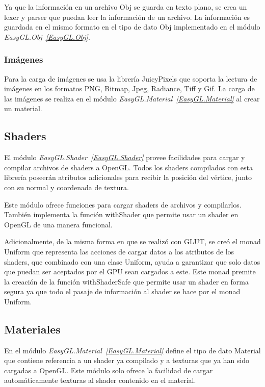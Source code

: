 Ya que la información en un archivo Obj se guarda en texto plano, se crea un lexer y parser que puedan leer la información de un archivo. La información es guardada en el mismo formato en el tipo de dato Obj implementado en el módulo \emph{EasyGL.Obj~\ref{EasyGL.Obj}}.

\subsubsection{Imágenes}

Para la carga de imágenes se usa la librería JuicyPixels \cite{libreria:JuicyPixels} que soporta la lectura de imágenes en los formatos PNG, Bitmap, Jpeg, Radiance, Tiff y Gif. La carga de las imágenes se realiza en el módulo \emph{EasyGL.Material~\ref{EasyGL.Material}} al crear un material.

\subsection{Shaders}

El módulo \emph{EasyGL.Shader~\ref{EasyGL.Shader}} provee facilidades para cargar y compilar archivos de shaders a OpenGL. Todos los shaders compilados con esta librería poseerán atributos adicionales para recibir la posición del vértice, junto con su normal y coordenada de textura.

Este módulo ofrece funciones para cargar shaders de archivos y compilarlos. También implementa la función withShader que permite usar un shader en OpenGL de una manera funcional.

Adicionalmente, de la misma forma en que se realizó con GLUT,  se creó el monad Uniform que representa las acciones de cargar datos a los atributos de los shaders, que combinado con una clase Uniform, ayuda a garantizar que solo datos que puedan ser aceptados por el GPU sean cargados a este. Este monad premite la creación de la función withShaderSafe que permite usar un shader en forma segura ya que todo el pasaje de información al shader se hace por el monad Uniform.

\subsection{Materiales}

En el módulo \emph{EasyGL.Material~\ref{EasyGL.Material}} define el tipo de dato Material que contiene referencia a un shader ya compilado y a texturas que ya han sido cargadas a OpenGL. Este módulo solo ofrece la facilidad de cargar automáticamente texturas al shader contenido en el material.

